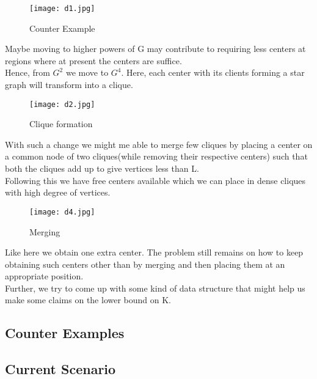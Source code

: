 \documentclass[12pt,a4paper,onecolumn]{article}
\begin{document}
\begin{itemize}
\begin{figure}
\begin{center}
\texttt{[image: d1.jpg]}
  \caption{Counter Example}
  \label{Figure 9}
\end{center}
\end{figure} Maybe moving to higher powers of G may contribute to requiring less centers at regions where at present the centers are suffice.\\Hence, from $G^2$ we move to $G^4$. Here, each center with its clients forming a star graph will transform into a clique.\begin{figure}
\begin{center}
\texttt{[image: d2.jpg]}
  \caption{Clique formation}
  \label{Figure 10}
\end{center}
\end{figure} With such a change we might me able to merge few cliques by placing a center on a common node of two cliques(while removing their respective centers) such that both the cliques add up to give vertices less than L. \\
Following this we have free centers available which we can place in dense cliques with high degree of vertices.
\begin{figure}
\begin{center}
\texttt{[image: d4.jpg]}
  \caption{Merging}
  \label{Figure 11}
\end{center}
\end{figure}
Like here we obtain one extra center. The problem still remains on how to keep obtaining such centers other than by merging and then placing them at an appropriate position.\\
Further, we try to come up with some kind of data structure that might help us make some claims on the lower bound on K. 

\end{itemize}
\subsection{Counter Examples}
\subsection{Current Scenario}
\end{document}
